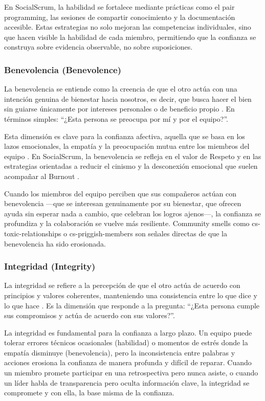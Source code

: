 En SocialScrum, la habilidad se fortalece mediante prácticas como el pair programming, las sesiones de compartir conocimiento y la documentación accesible. Estas estrategias no solo mejoran las competencias individuales, sino que hacen visible la habilidad de cada miembro, permitiendo que la confianza se construya sobre evidencia observable, no sobre suposiciones.

\subsubsection{Benevolencia (Benevolence)}

La benevolencia se entiende como la creencia de que el otro actúa con una intención genuina de bienestar hacia nosotros, es decir, que busca hacer el bien sin guiarse únicamente por intereses personales o de beneficio propio \cite{mayer_integrative_1995}. En términos simples: ``¿Esta persona se preocupa por mí y por el equipo?''.

Esta dimensión es clave para la confianza afectiva, aquella que se basa en los lazos emocionales, la empatía y la preocupación mutua entre los miembros del equipo \cite{wilson_all_2006}. En SocialScrum, la benevolencia se refleja en el valor de Respeto y en las estrategias orientadas a reducir el cinismo y la desconexión emocional que suelen acompañar al Burnout \cite{tulili2022burnout}.

Cuando los miembros del equipo perciben que sus compañeros actúan con benevolencia —que se interesan genuinamente por su bienestar, que ofrecen ayuda sin esperar nada a cambio, que celebran los logros ajenos—, la confianza se profundiza y la colaboración se vuelve más resiliente. Community smells como \gls{cs-toxic-relationships} o \gls{cs-priggish-members} son señales directas de que la benevolencia ha sido erosionada.

\subsubsection{Integridad (Integrity)}

La integridad se refiere a la percepción de que el otro actúa de acuerdo con principios y valores coherentes, manteniendo una consistencia entre lo que dice y lo que hace \cite{mayer_integrative_1995}. Es la dimensión que responde a la pregunta: ``¿Esta persona cumple sus compromisos y actúa de acuerdo con sus valores?''.

La integridad es fundamental para la confianza a largo plazo. Un equipo puede tolerar errores técnicos ocasionales (habilidad) o momentos de estrés donde la empatía disminuye (benevolencia), pero la inconsistencia entre palabras y acciones erosiona la confianza de manera profunda y difícil de reparar. Cuando un miembro promete participar en una retrospectiva pero nunca asiste, o cuando un líder habla de transparencia pero oculta información clave, la integridad se compromete y con ella, la base misma de la confianza.

